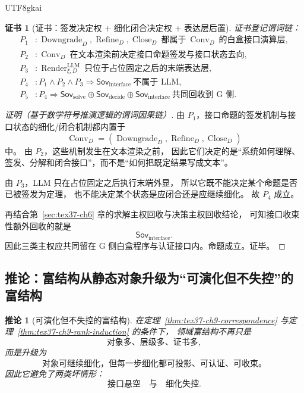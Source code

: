 \documentclass[12pt]{article}
\newtheorem{corollary}{推论}[section]
\newtheorem{Certificate}{证书}[section]
\newcommand{\Conv}{\operatorname{Conv}}
\newcommand{\Downgrade}{\operatorname{Downgrade}}
\newcommand{\Refine}{\operatorname{Refine}}
\newcommand{\Close}{\operatorname{Close}}
\newcommand{\Render}{\operatorname{Render}}
\begin{document}
\begin{CJK*}{UTF8}{gkai}
\begin{Certificate}[证书：签发决定权 + 细化闭合决定权 + 表达层后置]
\label{cert:tex37-ch9-interface-sovereignty}
证书登记谓词链：
\[
\begin{aligned}
  P_1 &: \Downgrade_D,\Refine_D,\Close_D\ \text{都属于}\ \Conv_D\ \text{的白盒接口演算层},\\
  P_2 &: \Conv_D\ \text{在文本渲染前决定接口命题签发与接口状态去向},\\
  P_3 &: \Render^{\mathrm{LLM}}_{\xi,D}\ \text{只位于占位固定之后的末端表达层},\\
  P_4 &: P_1\wedge P_2\wedge P_3\Rightarrow \mathsf{Sov}_{\mathrm{interface}}\ \text{不属于 LLM},\\
  P_5 &: P_4\Rightarrow \mathsf{Sov}_{\mathrm{solve}}\oplus\mathsf{Sov}_{\mathrm{decide}}\oplus\mathsf{Sov}
    _{\mathrm{interface}}
  \ \text{共同回收到 G 侧}.
\end{aligned}
\]
\end{Certificate}

\begin{proof}[证明（基于数学符号推演逻辑的谓词因果链）]
由 $P_1$，接口命题的签发机制与接口状态的细化/闭合机制都内置于
\[
  \Conv_D=(\Downgrade_D,\Refine_D,\Close_D)
\]
中。
由 $P_2$，这些机制发生在文本渲染之前，
因此它们决定的是“系统如何理解、签发、分解和闭合接口”，而不是“如何把既定结果写成文本”。

由 $P_3$，LLM 只在占位固定之后执行末端外显，
所以它既不能决定某个命题是否已被签发为定理，
也不能决定某个状态是应闭合还是应继续细化。
故 $P_4$ 成立。

再结合第~\ref{sec:tex37-ch6} 章的求解主权回收与决策主权回收结论，
可知接口收束性额外回收的就是
\[
  \mathsf{Sov}_{\mathrm{interface}}.
\]
因此三类主权应共同留在 G 侧白盒程序与认证接口内。命题成立。证毕。
\end{proof}

\subsection{推论：富结构从静态对象升级为“可演化但不失控”的富结构}
\label{subsec:tex37-ch9-corollary-evolve}

\begin{corollary}[可演化但不失控的富结构]
\label{cor:tex37-ch9-evolve}
在定理~\ref{thm:tex37-ch9-correspondence} 与定理~\ref{thm:tex37-ch9-rank-induction} 的条件下，
领域富结构不再只是
\[
  \text{对象多、层级多、证书多},
\]
而是升级为
\[
  \boxed{
    \text{对象可继续细化，但每一步细化都可投影、可认证、可收束。}
  }
\]
因此它避免了两类坏情形：
\[
  \text{接口悬空}
  \quad\text{与}\quad
  \text{细化失控}.
\]
\end{corollary}


\end{CJK*}
\end{document}
